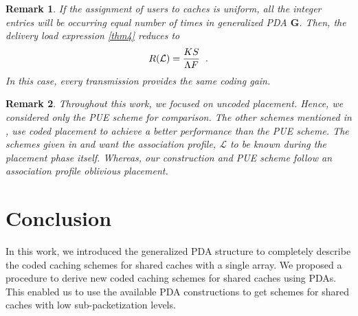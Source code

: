 \documentclass[conference,a4paper,10pt]{IEEEtran}
\newtheorem{rem}{Remark}
\begin{document}
\begin{rem}
If the assignment of users to caches is uniform, all the integer entries will be occurring equal number of times in generalized PDA $\mathbf{G}$. Then, the delivery load expression \eqref{thm4} reduces to
\begin{equation}
R(\mathcal{L}) = \frac{K S}{\Lambda F} \textrm {\hspace{0.2cm}.}
\end{equation} 
In this case, every transmission provides the same coding gain.
\end{rem}

\begin{rem}
Throughout this work, we focused on uncoded placement. Hence, we considered only the PUE scheme for comparison. The other schemes mentioned in \cite{IZY}, \cite{XGW} use coded placement to achieve a better performance than the PUE scheme. The schemes given in \cite{IZY} and \cite{PaE}  want the association profile, $\mathcal{L}$ to be known during the placement phase itself. Whereas, our construction and PUE scheme follow an association profile oblivious placement.

\end{rem}


\section{Conclusion}


In this work, we introduced the generalized PDA structure to completely describe the coded caching schemes for shared caches with a single array. We proposed a procedure to derive new coded caching schemes for shared caches using PDAs. This enabled us to use the available PDA constructions to get schemes for shared caches with low sub-packetization levels.

\begin{comment}
\section*{Acknowledgement}
This work was supported partly by the Science and Engineering Research Board (SERB) of Department of Science and Technology (DST), Government of India, through J.C Bose National Fellowship to B. Sundar Rajan.

\end{comment}
\end{document}
